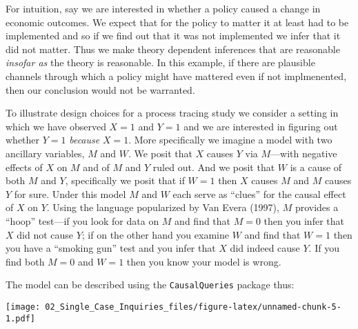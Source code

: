 \documentclass[
]{article}
\newenvironment{Shaded}{\begin{snugshade}}{\end{snugshade}}
\newcommand{\KeywordTok}[1]{\textcolor[rgb]{0.13,0.29,0.53}{\textbf{#1}}}
\newcommand{\NormalTok}[1]{#1}
\newcommand{\OperatorTok}[1]{\textcolor[rgb]{0.81,0.36,0.00}{\textbf{#1}}}
\newcommand{\StringTok}[1]{\textcolor[rgb]{0.31,0.60,0.02}{#1}}
\begin{document}
For intuition, say we are interested in whether a policy caused a change
in economic outcomes. We expect that for the policy to matter it at
least had to be implemented and so if we find out that it was not
implemented we infer that it did not matter. Thus we make theory
dependent inferences that are reasonable \emph{insofar as} the theory is
reasonable. In this example, if there are plausible channels through
which a policy might have mattered even if not implmenented, then our
conclusion would not be warranted.

To illustrate design choices for a process tracing study we consider a
setting in which we have observed \(X=1\) and \(Y=1\) and we are
interested in figuring out whether \(Y=1\) \emph{because} \(X=1\). More
specifically we imagine a model with two ancillary variables, \(M\) and
\(W\). We posit that \(X\) causes \(Y\) via \(M\)---with negative
effects of \(X\) on \(M\) and of \(M\) and \(Y\) ruled out. And we posit
that \(W\) is a cause of both \(M\) and \(Y\), specifically we posit
that if \(W=1\) then \(X\) causes \(M\) and \(M\) causes \(Y\) for sure.
Under this model \(M\) and \(W\) each serve as ``clues'' for the causal
effect of \(X\) on \(Y\). Using the language popularized by Van Evera
(1997), \(M\) provides a ``hoop'' test---if you look for data on \(M\)
and find that \(M=0\) then you infer that \(X\) did not cause \(Y\); if
on the other hand you examine \(W\) and find that \(W=1\) then you have
a ``smoking gun'' test and you infer that \(X\) did indeed cause \(Y\).
If you find both \(M=0\) and \(W=1\) then you know your model is wrong.

The model can be described using the \texttt{CausalQueries} package
thus:

\begin{Shaded}
\end{Shaded}

\texttt{[image: 02\_Single\_Case\_Inquiries\_files/figure-latex/unnamed-chunk-5-1.pdf]}
\end{document}
